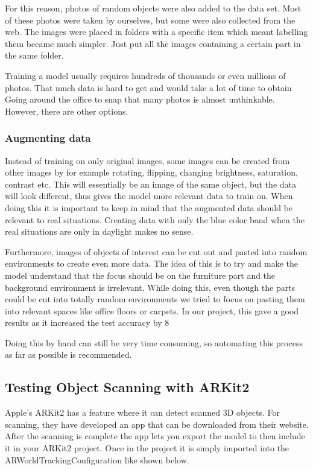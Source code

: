 For this reason, photos of random objects were also added to the data set. Most of these photos were taken by ourselves, but some were also collected from the web. The images were placed in folders with a specific item which meant labelling them became much simpler. Just put all the images containing a certain part in the same folder.

Training a model usually requires hundreds of thousands or even millions of photos. That much data is hard to get and would take a lot of time to obtain Going around the office to snap that many photos is almost unthinkable.
However, there are other options.

\subsubsection{Augmenting data}
Instead of training on only original images, some images can be created from other images by for example rotating, flipping, changing brightness, saturation, contrast etc.  This will essentially be an image of the same object, but the data will look different, thus gives the model more relevant data to train on.
When doing this it is important to keep in mind that the augmented data should be relevant to real situations.
Creating data with only the blue color band when the real situations are only in daylight makes no sense.

Furthermore, images of objects of interest can be cut out and pasted into random environments to create even more data.
The idea of this is to try and make the model understand that the focus should be on the furniture part and the background environment is irrelevant. While doing this, even though the parts could be cut into totally random environments we tried to focus on pasting them into relevant spaces like office floors or carpets.
In our project, this gave a good results as it increased the test accuracy by 8%

Doing this by hand can still be very time consuming, so automating this process as far as possible is recommended.

\subsection{Testing Object Scanning with ARKit2}
Apple's ARKit2 has a feature where it can detect scanned 3D objects. For scanning, they have developed an app that can be downloaded from their website. \cite{ARScanning}
After the scanning is complete the app lets you export the model to then include it in your ARKit2 project. Once in the project it is simply imported into the ARWorldTrackingConfiguration like shown below.

